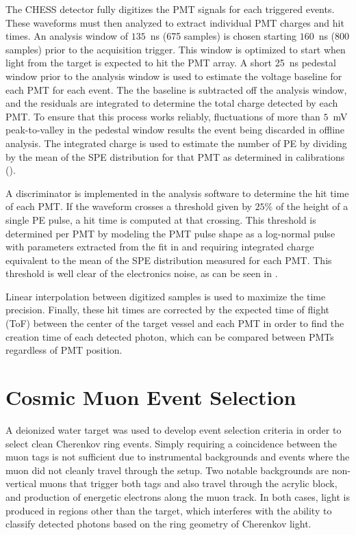 The CHESS detector fully digitizes the PMT signals for each triggered events.
These waveforms must then analyzed to extract individual PMT charges and hit times. 
An analysis window of $135$~ns (675 samples) is chosen starting $160$~ns (800 samples) prior to the acquisition trigger. 
This window is optimized to start when light from the target is expected to hit the PMT array. 
A short 25~ns pedestal window prior to the analysis window is used to estimate the voltage baseline for each PMT for each event.
The the baseline is subtracted off the analysis window, and the residuals are integrated to determine the total charge detected by each PMT. 
To ensure that this process works reliably, fluctuations of more than $5$~mV peak-to-valley in the pedestal window results the event being discarded in offline analysis.  
The integrated charge is used to estimate the number of PE by dividing by the mean of the SPE distribution for that PMT as determined in calibrations ().

A discriminator is implemented in the analysis software to determine the hit time of each PMT.
If the waveform crosses a threshold given by $25\%$ of the height of a single PE pulse, a hit time is computed at that crossing.
This threshold is determined per PMT by modeling the PMT pulse shape as a log-normal pulse with parameters extracted from the fit in  and requiring integrated charge equivalent to the mean of the SPE distribution measured for each PMT.
This threshold is well clear of the electronics noise, as can be seen in . 

Linear interpolation between digitized samples is used to maximize the time precision. 
Finally, these hit times are corrected by the expected time of flight (ToF) between the center of the target vessel and each PMT in order to find the creation time of each detected photon, which can be compared between PMTs regardless of PMT position.


\section{Cosmic Muon Event Selection}\label{s:event}

A deionized water target was used to develop event selection criteria in order to select clean Cherenkov ring events.
Simply requiring a coincidence between the muon tags is not sufficient due to instrumental backgrounds and events where the muon did not cleanly travel through the setup.
Two notable backgrounds are non-vertical muons that trigger both tags and also travel through the acrylic block, and production of energetic electrons along the muon track.
In both cases, light is produced in regions other than the target, which interferes with the ability to classify detected photons based on the ring geometry of Cherenkov light.

